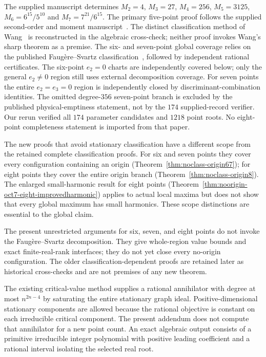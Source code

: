\documentclass[11pt]{article}
\theoremstyle{remark}
\numberwithin{equation}{section}
\begin{document}
The supplied manuscript determines $M_2=4$, $M_3=27$, $M_4=256$,
$M_5=3125$, $M_6=6^{15}/5^{10}$ and $M_7=7^{21}/6^{15}$.
The primary five-point proof follows the supplied second-order and moment
manuscript~\cite{JiangFive}. The distinct classification method of
Wang~\cite{Wang} is reconstructed in the algebraic cross-check;
neither proof invokes Wang's sharp theorem as a premise.
The six- and
seven-point global coverage relies on the published Faug\`ere--Svartz
classification~\cite{FS}, followed by independent rational certificates.
The six-point $e_2=0$ charts are independently covered below; only the
general $e_2\ne0$ region still uses external decomposition coverage.
For seven points the entire $e_2=e_3=0$ region is independently
closed by discriminant-combination identities.
The omitted degree-$356$ seven-point branch is excluded by the published
physical-emptiness statement, not by the $174$ supplied-record verifier.
Our rerun verified all $174$ parameter candidates and $1218$ point roots.
No eight-point completeness statement is imported from that paper.


The new proofs that avoid stationary classification have a different
scope from the retained complete classification proofs. For six and
seven points they cover every configuration containing an origin
(Theorem~\ref{thm:noclass-origin67}); for eight points they cover
the entire origin branch (Theorem~\ref{thm:noclass-origin8}).
The enlarged small-harmonic result for eight points
(Theorem~\ref{thm:noorigin-oct7-eight-improvedharmonic}) applies to actual local
maxima but does not show that every global maximum has small harmonics.
These scope distinctions are essential to the global claim.

The present unrestricted arguments for six, seven, and eight points
do not invoke the Faug\`ere--Svartz decomposition. They give whole-region
value bounds and exact finite-real-rank interfaces; they do not yet
close every no-origin configuration. The older classification-dependent
proofs are retained later as historical cross-checks and are not premises
of any new theorem.

The existing critical-value method supplies a rational annihilator with
degree at most $n^{2n-4}$ by saturating the entire stationary graph ideal.
Positive-dimensional stationary components are allowed because the
rational objective is constant on each irreducible critical component.
The present addendum does not compute that annihilator for a new point count.
An exact algebraic output consists of a primitive irreducible integer
polynomial with positive leading coefficient and a rational interval
isolating the selected real root.
\end{document}
